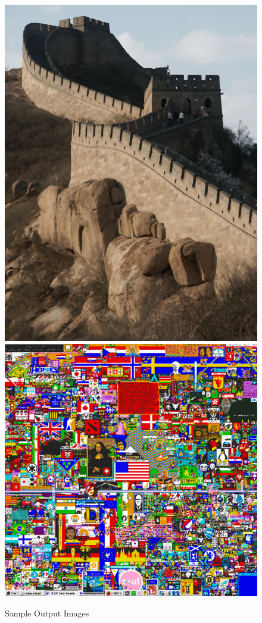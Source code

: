 \begin{figure}[!]
	\includegraphics[scale=0.04]{Figures/greatwallO.jpg}
	\includegraphics[scale=0.04]{Figures/placeO.jpg}	
    \caption{Sample Output Images}
	\label{tss}
\end{figure}